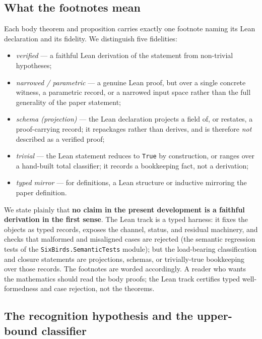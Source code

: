 \documentclass[11pt]{article}
\theoremstyle{definition}
\begin{document}
\subsection{What the footnotes mean}\label{app:fidelity-legend}

Each body theorem and proposition carries exactly one footnote naming its Lean
declaration and its fidelity. We distinguish five fidelities:
\begin{itemize}[topsep=2pt,itemsep=1pt]
  \item \emph{verified} --- a faithful Lean derivation of the statement from
    non-trivial hypotheses;
  \item \emph{narrowed / parametric} --- a genuine Lean proof, but over a single
    concrete witness, a parametric record, or a narrowed input space rather than
    the full generality of the paper statement;
  \item \emph{schema (projection)} --- the Lean declaration projects a field of,
    or restates, a proof-carrying record; it repackages rather than derives, and
    is therefore \emph{not} described as a verified proof;
  \item \emph{trivial} --- the Lean statement reduces to \texttt{True} by
    construction, or ranges over a hand-built total classifier; it records a
    bookkeeping fact, not a derivation;
  \item \emph{typed mirror} --- for definitions, a Lean structure or inductive
    mirroring the paper definition.
\end{itemize}
We state plainly that \textbf{no claim in the present development is a faithful
derivation in the first sense}. The Lean track is a typed harness: it fixes the
objects as typed records, exposes the channel, status, and residual machinery,
and checks that malformed and misaligned cases are rejected (the semantic
regression tests of the \texttt{SixBirds.SemanticTests} module); but the
load-bearing classification and closure statements are projections, schemas, or
trivially-true bookkeeping over those records. The footnotes are worded
accordingly. A reader who wants the mathematics should read the body proofs; the
Lean track certifies typed well-formedness and case rejection, not the theorems.

\subsection{The recognition hypothesis and the upper-bound classifier}\label{app:recognition}
\end{document}
